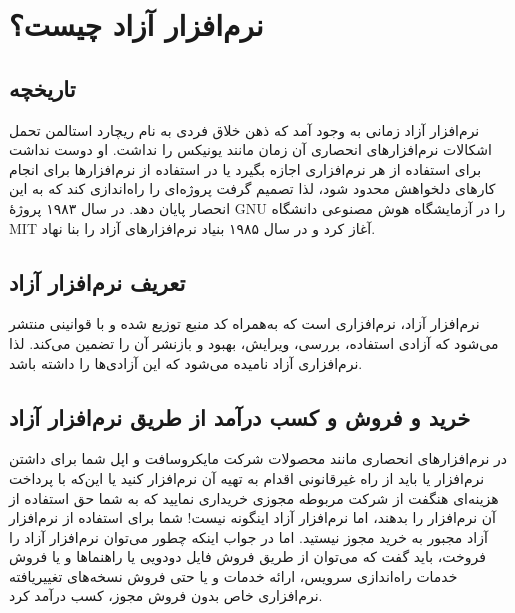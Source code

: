 \documentclass{article}
\begin{document}
\section{نرم‌افزار آزاد چیست؟}
\subsection{تاریخچه}
نرم‌افزار آزاد زمانی به وجود آمد که ذهن خلاق فردی به نام ریچارد استالمن تحمل اشکالات نرم‌افزارهای انحصاری آن زمان مانند یونیکس را نداشت. او دوست نداشت برای استفاده از هر نرم‌افزاری اجازه بگیرد یا در استفاده از نرم‌افزارها برای انجام کار‌های دلخواهش محدود شود، لذا تصمیم گرفت پروژه‌ای را راه‌اندازی کند که به این انحصار پایان دهد. در سال ۱۹۸۳ پروژهٔ GNU را در آزمایشگاه هوش مصنوعی دانشگاه MIT آغاز کرد و در سال ۱۹۸۵ بنیاد نرم‌افزار‌های آزاد را بنا نهاد.
\subsection{تعریف نرم‌افزار آزاد}
نرم‌افزار آزاد، نرم‌افزاری است که به‌همراه کد منبع توزیع شده و با قوانینی منتشر می‌شود که آزادی استفاده، بررسی، ویرایش، بهبود و بازنشر آن را تضمین می‌کند. لذا نرم‌افزاری آزاد نامیده می‌شود که این آزادی‌ها را داشته باشد.
\subsection{خرید و فروش و کسب درآمد از طریق نرم‌افزار آزاد}

در نرم‌افزارهای انحصاری مانند محصولات شرکت مایکروسافت و اپل شما برای داشتن نرم‌افزار یا باید از راه غیر‌قانونی اقدام به تهیه آن نرم‌افزار کنید یا این‌که با پرداخت هزینه‌ای هنگفت از شرکت مربوطه مجوزی خریداری نمایید که به شما حق استفاده از آن نرم‌افزار را بدهند، اما نرم‌افزار آزاد اینگونه نیست! شما برای استفاده از نرم‌افزار آزاد مجبور به خرید مجوز نیستید. اما در جواب اینکه چطور می‌توان نرم‌افزار آزاد را فروخت، باید گفت که می‌توان از طریق فروش فایل دودویی یا راهنما‌ها و یا فروش خدمات راه‌اندازی سرویس، ارائه خدمات و یا حتی فروش نسخه‌های تغییر‌یافته نرم‌افزاری خاص بدون فروش مجوز، کسب در‌آمد کرد.
\end{document}
